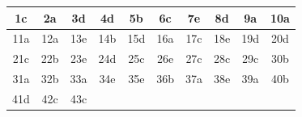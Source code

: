 \begin{center}
\renewcommand{\arraystretch}{1.2}
\begin{tabular}{|c|c|c|c|c|c|c|c|c|c|}
\hline
1c & 2a & 3d & 4d & 5b & 6c & 7e & 8d & 9a & 10a \\
\hline
11a & 12a & 13e & 14b & 15d & 16a & 17c & 18e & 19d & 20d \\
\hline
21c & 22b & 23e & 24d & 25c & 26e & 27c & 28c & 29c & 30b \\
\hline
31a & 32b & 33a & 34e & 35e & 36b & 37a & 38e & 39a & 40b \\
\hline
41d & 42c & 43c & & & & & & & \\
\hline
\end{tabular}
\end{center}


